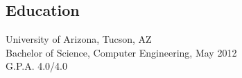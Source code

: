 \documentclass{res}
\begin{document}
\begin{resume}
\section{Education}
\vspace{0.1in} 
  University of Arizona, Tucson, AZ  \\        
  Bachelor of Science, Computer Engineering, May 2012   \\       
  G.P.A. 4.0/4.0          
    
 
\end{resume}
\end{document}
